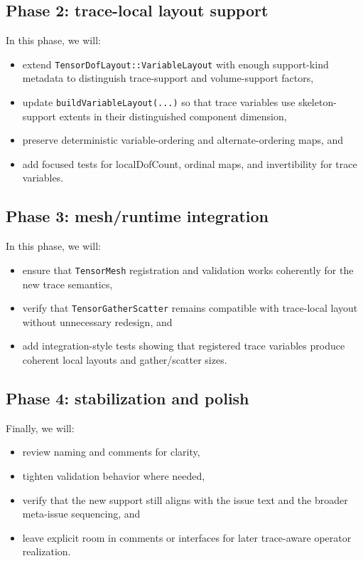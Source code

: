 \documentclass[11pt]{article}
\begin{document}
\subsection{Phase 2: trace-local layout support}

In this phase, we will:
\begin{itemize}[leftmargin=2em]
  \item extend \texttt{TensorDofLayout::VariableLayout} with enough support-kind metadata to distinguish trace-support and volume-support factors,
  \item update \texttt{buildVariableLayout(...)} so that trace variables use skeleton-support extents in their distinguished component dimension,
  \item preserve deterministic variable-ordering and alternate-ordering maps, and
  \item add focused tests for localDofCount, ordinal maps, and invertibility for trace variables.
\end{itemize}

\subsection{Phase 3: mesh/runtime integration}

In this phase, we will:
\begin{itemize}[leftmargin=2em]
  \item ensure that \texttt{TensorMesh} registration and validation works coherently for the new trace semantics,
  \item verify that \texttt{TensorGatherScatter} remains compatible with trace-local layout without unnecessary redesign, and
  \item add integration-style tests showing that registered trace variables produce coherent local layouts and gather/scatter sizes.
\end{itemize}

\subsection{Phase 4: stabilization and polish}

Finally, we will:
\begin{itemize}[leftmargin=2em]
  \item review naming and comments for clarity,
  \item tighten validation behavior where needed,
  \item verify that the new support still aligns with the issue text and the broader meta-issue sequencing, and
  \item leave explicit room in comments or interfaces for later trace-aware operator realization.
\end{itemize}
\end{document}
